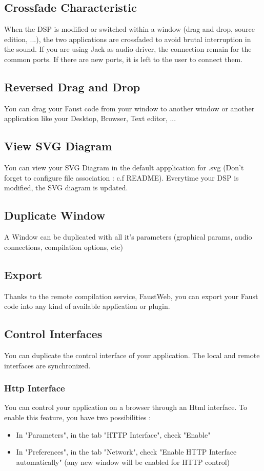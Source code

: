\documentclass[a4paper]{article}
\begin{document}
\subsection{Crossfade Characteristic}

When the DSP is modified or switched within a window (drag and drop, source edition, ...), the two applications are crossfaded to avoid brutal interruption in the sound. If you are using Jack as audio driver, the connection remain for the common ports. If there are new ports, it is left to the user to connect them. 

\subsection{Reversed Drag and Drop}
You can drag your Faust code from your window to another window or another application like your Desktop, Browser, Text editor, ...

\subsection{View SVG Diagram}
You can view your SVG Diagram in the default appplication for .svg (Don't forget to configure file association : c.f README). Everytime your DSP is modified, the SVG diagram is updated.

\subsection{Duplicate Window}
A Window can be duplicated with all it's parameters (graphical params, audio connections, compilation options, etc)

\subsection{Export}
Thanks to the remote compilation service, FaustWeb, you can export your Faust code into any kind of available application or plugin. 

\subsection{Control Interfaces}
You can duplicate the control interface of your application. The local and remote interfaces are synchronized.

\subsubsection{Http Interface}
	You can control your application on a browser through an Html interface. To enable this feature, you have two possibilities :
	\begin{itemize}
	\item In "Parameters", in the tab "HTTP Interface", check "Enable"
	\item In "Preferences", in the tab "Network", check "Enable HTTP Interface automatically" (any new window will be enabled for HTTP control)
	\end{itemize}
	
\end{document}
